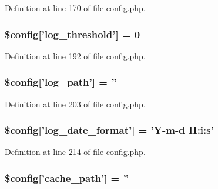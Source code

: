 Definition at line 170 of file config.\-php.

\hypertarget{application_2config_2config_8php_a7e7fe9a5aa2c85e48865b154035dab6a}{
\subsubsection[{\$config}]{\setlength{\rightskip}{0pt plus 5cm}\$config\mbox{[}'log\-\_\-threshold'\mbox{]} = 0}}\label{application_2config_2config_8php_a7e7fe9a5aa2c85e48865b154035dab6a}


Definition at line 192 of file config.\-php.

\hypertarget{application_2config_2config_8php_aee8524f2388d21b1c73de5c48a82b687}{
\subsubsection[{\$config}]{\setlength{\rightskip}{0pt plus 5cm}\$config\mbox{[}'log\-\_\-path'\mbox{]} = ''}}\label{application_2config_2config_8php_aee8524f2388d21b1c73de5c48a82b687}


Definition at line 203 of file config.\-php.

\hypertarget{application_2config_2config_8php_a9cc05811c32c13c55ed407435a3a31b6}{
\subsubsection[{\$config}]{\setlength{\rightskip}{0pt plus 5cm}\$config\mbox{[}'log\-\_\-date\-\_\-format'\mbox{]} = 'Y-\/m-\/{\bf d} H\-:i\-:s'}}\label{application_2config_2config_8php_a9cc05811c32c13c55ed407435a3a31b6}


Definition at line 214 of file config.\-php.

\hypertarget{application_2config_2config_8php_ae3a5dd52b4d040adb6461b9a17d1e0f0}{
\subsubsection[{\$config}]{\setlength{\rightskip}{0pt plus 5cm}\$config\mbox{[}'cache\-\_\-path'\mbox{]} = ''}}\label{application_2config_2config_8php_ae3a5dd52b4d040adb6461b9a17d1e0f0}


